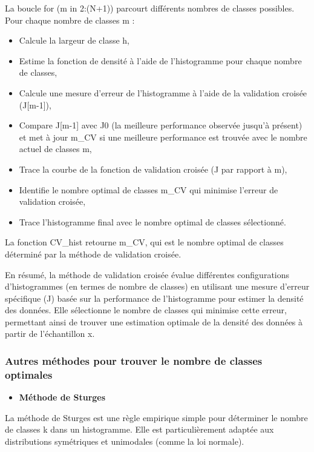 \documentclass[
  12pt,
]{article}
\providecommand{\tightlist}{%
  \setlength{\itemsep}{0pt}\setlength{\parskip}{0pt}}
\begin{document}
La boucle for (m in 2:(N+1)) parcourt différents nombres de classes
possibles. Pour chaque nombre de classes m :

\begin{itemize}
\tightlist
\item
  Calcule la largeur de classe h,
\item
  Estime la fonction de densité à l'aide de l'histogramme pour chaque
  nombre de classes,
\item
  Calcule une mesure d'erreur de l'histogramme à l'aide de la validation
  croisée (J{[}m-1{]}),
\item
  Compare J{[}m-1{]} avec J0 (la meilleure performance observée jusqu'à
  présent) et met à jour m\_CV si une meilleure performance est trouvée
  avec le nombre actuel de classes m,
\item
  Trace la courbe de la fonction de validation croisée (J par rapport à
  m),
\item
  Identifie le nombre optimal de classes m\_CV qui minimise l'erreur de
  validation croisée,
\item
  Trace l'histogramme final avec le nombre optimal de classes
  sélectionné.
\end{itemize}

La fonction CV\_hist retourne m\_CV, qui est le nombre optimal de
classes déterminé par la méthode de validation croisée.

En résumé, la méthode de validation croisée évalue différentes
configurations d'histogrammes (en termes de nombre de classes) en
utilisant une mesure d'erreur spécifique (J) basée sur la performance de
l'histogramme pour estimer la densité des données. Elle sélectionne le
nombre de classes qui minimise cette erreur, permettant ainsi de trouver
une estimation optimale de la densité des données à partir de
l'échantillon x.

\subsubsection{Autres méthodes pour trouver le nombre de classes
optimales}\label{autres-muxe9thodes-pour-trouver-le-nombre-de-classes-optimales}

\begin{itemize}
\tightlist
\item
  \textbf{Méthode de Sturges}
\end{itemize}

La méthode de Sturges est une règle empirique simple pour déterminer le
nombre de classes k dans un histogramme. Elle est particulièrement
adaptée aux distributions symétriques et unimodales (comme la loi
normale).
\end{document}
